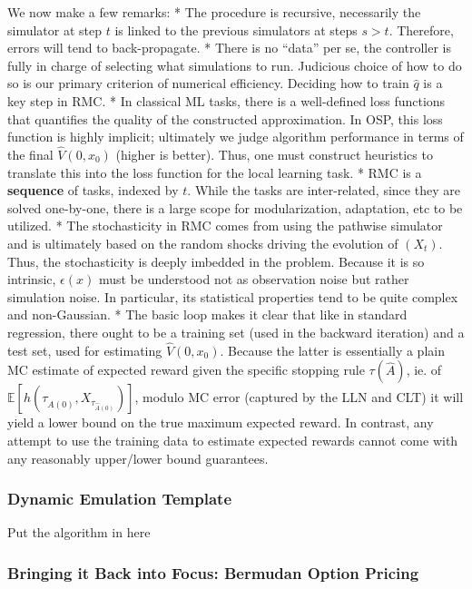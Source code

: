 \documentclass[]{article}
\begin{document}
We now make a few remarks: * The procedure is recursive, necessarily the
simulator at step \(t\) is linked to the previous simulators at steps
\(s > t\). Therefore, errors will tend to back-propagate. * There is no
``data'' per se, the controller is fully in charge of selecting what
simulations to run. Judicious choice of how to do so is our primary
criterion of numerical efficiency. Deciding how to train \(\hat{q}\) is
a key step in RMC. * In classical ML tasks, there is a well-defined loss
functions that quantifies the quality of the constructed approximation.
In OSP, this loss function is highly implicit; ultimately we judge
algorithm performance in terms of the final \(\hat{V}(0,x_0)\) (higher
is better). Thus, one must construct heuristics to translate this into
the loss function for the local learning task. * RMC is a
\textbf{sequence} of tasks, indexed by \(t\). While the tasks are
inter-related, since they are solved one-by-one, there is a large scope
for modularization, adaptation, etc to be utilized. * The stochasticity
in RMC comes from using the pathwise simulator and is ultimately based
on the random shocks driving the evolution of \((X_t)\). Thus, the
stochasticity is deeply imbedded in the problem. Because it is so
intrinsic, \(\epsilon(x)\) must be understood not as observation noise
but rather simulation noise. In particular, its statistical properties
tend to be quite complex and non-Gaussian. * The basic loop makes it
clear that like in standard regression, there ought to be a training set
(used in the backward iteration) and a test set, used for estimating
\(\hat{V}(0,x_0)\). Because the latter is essentially a plain MC
estimate of expected reward given the specific stopping rule
\(\tau(\hat{A})\), ie. of
\(\mathbb{E}[ h(\tau_{\hat{A}(0)}, X_{\tau_{\hat{A}(0)}})]\), modulo MC
error (captured by the LLN and CLT) it will yield a lower bound on the
true maximum expected reward. In contrast, any attempt to use the
training data to estimate expected rewards cannot come with any
reasonably upper/lower bound guarantees.

\subsubsection{Dynamic Emulation
Template}\label{dynamic-emulation-template}

Put the algorithm in here

\subsubsection{Bringing it Back into Focus: Bermudan Option
Pricing}\label{bringing-it-back-into-focus-bermudan-option-pricing}
\end{document}
